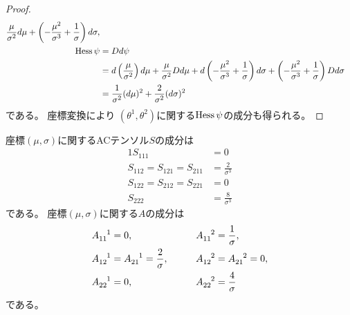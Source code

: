 \documentclass[report]{jlreq}
\begin{document}
\begin{proof}
\begin{alignat}{1}
                \frac{\mu}{\sigma^2}
                d\mu
                + \left({
                    - \frac{\mu^2}{\sigma^3}
                    + \frac{1}{\sigma}
                }\right)
                d\sigma,
                \\
        \operatorname{Hess}\psi
            &=
                Dd\psi
                \\
            &=
                d\left({
                    \frac{\mu}{\sigma^2}
                }\right)
                d\mu
                + \frac{\mu}{\sigma^2} Dd\mu
                + d\left({
                    - \frac{\mu^2}{\sigma^3}
                    + \frac{1}{\sigma}
                }\right)
                d\sigma
                + \left({
                    - \frac{\mu^2}{\sigma^3}
                    + \frac{1}{\sigma}
                }\right)
                Dd\sigma
                \\
            &=
                \frac{1}{\sigma^2} (d\mu)^2
                + \frac{2}{\sigma^2} (d\sigma)^2
    \end{alignat}
    である。
    座標変換により
    $(\theta^1, \theta^2)$に関する$\operatorname{Hess}\psi$の成分も得られる。
\end{proof}

\begin{proposition}[ACテンソルの成分]
    座標$(\mu, \sigma)$に関するACテンソル$S$の成分は
    \begin{alignat}{1}
        S_{111}
            &=
                0
                \\
        S_{112} = S_{121} = S_{211}
            &=
                \frac{2}{\sigma^3}
                \\
        S_{122} = S_{212} = S_{221}
            &=
                0
                \\
        S_{222}
            &=
                \frac{8}{\sigma^3}
    \end{alignat}
    である。
    座標$(\mu, \sigma)$に関する$A$の成分は
    \begin{alignat}{2}
        A_{11}^{\hphantom{11}1}
            &=
                0,
                \qquad
        &A_{11}^{\hphantom{11}2}
            &=
                \frac{1}{\sigma},
                \\
        A_{12}^{\hphantom{12}1}
            &=
                A_{21}^{\hphantom{21}1}
            =
                \frac{2}{\sigma},
                \qquad
        &A_{12}^{\hphantom{12}2}
            &=
                A_{21}^{\hphantom{21}2}
            =
                0,
                \\
        A_{22}^{\hphantom{22}1}
            &=
                0,
                \qquad
        &A_{22}^{\hphantom{22}2}
            &=
                \frac{4}{\sigma}
    \end{alignat}
    である。
\end{proposition}
\end{document}
